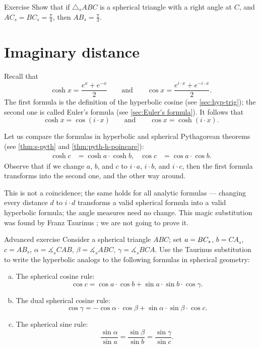 \begin{thm}{Exercise}\label{ex:2(pi/4)=pi/3}
Show that 
if $\triangle_sABC$ is a spherical triangle with a right angle at $C$,
and $AC_s=BC_s=\tfrac\pi4$, then $AB_s=\tfrac\pi3$.
\end{thm}



\section{Imaginary distance}

Recall that  
\[
\cosh x=\frac {e^{x}+e^{-x}}2
\qquad\text{and}\qquad
\cos x=\frac {e^{i\cdot x}+e^{-i\cdot x}}2.
\]
The first formula is the definition of the hyperbolic cosine (see \ref{sec:hyp-trig});
the second one is called Euler's formula (see \ref{sec:Euler's formula}).
It follows that 
\[\cosh x=\cos (i\cdot x)
\qquad\text{and}\qquad
\cos x=\cosh (i\cdot x).\]

Let us compare the formulas in hyperbolic and spherical Pythagorean theorems (see \ref{thm:s-pyth} and \ref{thm:pyth-h-poincare}):
\begin{align*}
\cosh c&=\cosh a\cdot \cosh b,
&
\cos c&=\cos a\cdot \cos b.
\end{align*}
Observe that if we change $a$, $b$, and $c$ to $i\cdot a$, $i\cdot b$, and $i\cdot c$,
then the first formula transforms into the second one, and the other way around.

This is not a coincidence;
the same holds for all analytic formulas ---
changing every distance $d$ to $i\cdot d$ transforms a valid spherical formula into a valid hyperbolic formula;
the angle measures need no change.
This magic substitution was found by Franz Taurinus \cite{taurinus}; we are not going to prove it.

\begin{thm}{Advanced exercise}\label{ex:taurinus}
Consider a spherical triangle $ABC$; set
$a=BC_s$, $b=CA_s$, $c=AB_s$,
$\alpha=\measuredangle_sCAB$, $\beta=\measuredangle_sABC$, $\gamma=\measuredangle_sBCA$.
Use the Taurinus substitution to write the hyperbolic analogs to the following formulas in spherical geometry:

\begin{enumerate}[(a)]
\item The spherical cosine rule:
\[\cos c=\cos a \cdot \cos b+\sin a\cdot \sin b\cdot \cos\gamma.\]
\item The dual spherical cosine rule:
\[\cos \gamma=-\cos \alpha \cdot \cos \beta+\sin \alpha\cdot \sin \beta \cdot \cos c.\]
\item
The spherical sine rule:
\[\frac{\sin \alpha}{\sin a}=\frac{\sin \beta}{\sin b}=\frac{\sin \gamma}{\sin c}.\]
\end{enumerate}
 
\end{thm}
